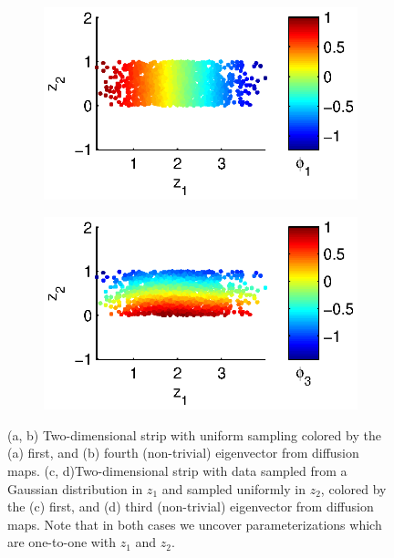 \documentclass[preprint]{elsarticle}
\begin{document}
\begin{figure}[t]
\begin{subfigure}{0.5\textwidth}
\includegraphics[width=\textwidth]{strip_nonuniform1}
\end{subfigure}
\begin{subfigure}{0.5\textwidth}
\includegraphics[width=\textwidth]{strip_nonuniform2}
\end{subfigure}
\caption{(a, b) Two-dimensional strip with uniform sampling colored by the (a) first, and (b) fourth (non-trivial) eigenvector from diffusion maps. (c, d)Two-dimensional strip with data sampled from a Gaussian distribution in $z_1$ and sampled uniformly in $z_2$, colored by the (c) first, and (d) third (non-trivial) eigenvector from diffusion maps. Note that in both cases we uncover parameterizations which are one-to-one with $z_1$ and $z_2$. }
\label{fig:strip_evecs}
\end{figure}
\end{document}

